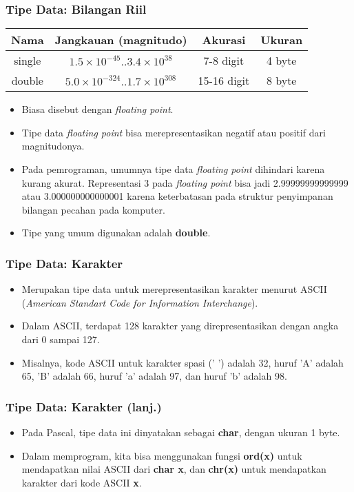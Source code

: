 \begin{frame}
\frametitle{Tipe Data: Bilangan Riil}
\begin{table}[ht]
  \begin{tabular}{|c|c|c|c|}
    \hline Nama  & Jangkauan (magnitudo) & Akurasi & Ukuran \\
    \hline single & $1.5\times10^{-45} .. 3.4\times10^{38}$ & 7-8 digit & 4 byte\\
    \hline double & $5.0\times10^{-324} .. 1.7\times10^{308}$ & 15-16 digit & 8 byte \\
    \hline
  \end{tabular}
\end{table}
\begin{itemize}
  \item Biasa disebut dengan \textit{floating point}.
  \item Tipe data \textit{floating point} bisa merepresentasikan negatif atau positif dari magnitudonya.
  \item Pada pemrograman, umumnya tipe data \textit{floating point} dihindari karena kurang akurat. Representasi 3 pada \textit{floating point} bisa jadi 2.99999999999999 atau 3.000000000000001 karena keterbatasan pada struktur penyimpanan bilangan pecahan pada komputer.
  \item Tipe yang umum digunakan adalah \alert{\textbf{double}}.
\end{itemize}
\end{frame}

\begin{frame}
\frametitle{Tipe Data: Karakter}
\begin{itemize}
  \item Merupakan tipe data untuk merepresentasikan karakter menurut ASCII (\textit{American Standart Code for Information Interchange}).
  \item Dalam ASCII, terdapat 128 karakter yang direpresentasikan dengan angka dari 0 sampai 127.
  \item Misalnya, kode ASCII untuk karakter spasi (' ') adalah 32, huruf 'A' adalah 65, 'B' adalah 66, huruf 'a' adalah 97, dan huruf 'b' adalah 98.
\end{itemize}
\end{frame}

\begin{frame}
\frametitle{Tipe Data: Karakter (lanj.)}
\begin{itemize}
  \item Pada Pascal, tipe data ini dinyatakan sebagai \alert{\textbf{char}}, dengan ukuran 1 byte.
  \item Dalam memprogram, kita bisa menggunakan fungsi \textbf{ord(x)} untuk mendapatkan nilai ASCII dari \textbf{char x}, dan \textbf{chr(x)} untuk mendapatkan karakter dari kode ASCII \textbf{x}.
\end{itemize}
\end{frame}

